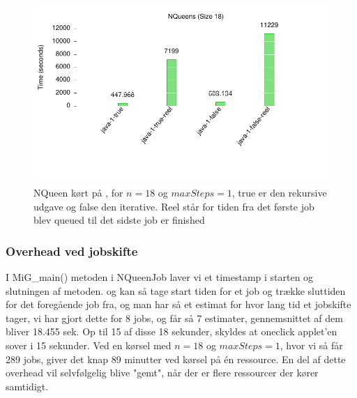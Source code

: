 \begin{figure}[h]
\begin{center}
\includegraphics{../benchmarks/mig1.pdf}
\caption{NQueen kørt på \mig, for $n=18$ og $maxSteps=1$, true er den
rekursive udgave og false den iterative. Reel står for tiden fra det første job
blev queued til det sidste job er finished}
\label{figur:mig1}
\end{center}
\end{figure}



\subsubsection{Overhead ved jobskifte}

I MiG\_main() metoden i NQueenJob laver vi et timestamp i starten og slutningen
af metoden.  og kan så tage start tiden for et job og trække sluttiden for det
foregående job fra, og man har så et estimat for hvor lang tid et jobskifte
tager, vi har gjort dette for 8 jobs, og får så 7 estimater, gennemsnittet af
dem bliver 18.455 sek.  Op til 15 af disse 18 sekunder, skyldes at oneclick
applet'en sover i 15 sekunder.  Ved en kørsel med $n=18$ og $maxSteps=1$, hvor
vi så får 289 jobs, giver det knap 89 minutter ved kørsel på én ressource. En del af dette overhead vil
selvfølgelig blive "gemt", når der er flere ressourcer der kører samtidigt.

